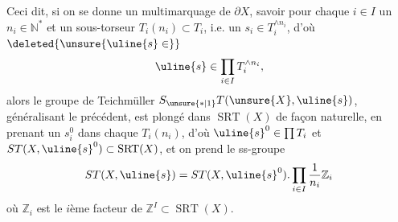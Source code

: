 
Ceci dit, si on se donne un
multimarquage de $\partial X$, savoir pour
chaque $i\in I$ un $n_i\in\mathbb N^*$ et un
sous-torseur
$T_i(n_i)\subset T_i$,
 i.e.
un $s_i\in T_i^{\wedge n_i}$, d'où
$\deleted{\unsure{\uline{s}\in}}$
\[
\uline{s}\in\prod_{i\in I}T_i^{\wedge n_i},
\]
alors le groupe de Teichmüller 
$S_{\unsure{*|1}}T(\unsure{X},\uline{s})$,
généralisant le précédent, est
plongé dans $\operatorname{SRT}(X)$ de façon naturelle,
en prenant un $s_i^0$ dans chaque $T_i(n_i)$, d'où
$\uline{s}^0\in\prod T_i$ et
$ST(X,\uline{s}^0)\subset\operatorname{SRT}(X)$,
et on prend le ss-groupe
\[
ST(X,\uline{s})=ST(X,\uline{s}^0).
\prod_{i\in I}\frac1{n_i}\mathbb Z_i
\]
où $\mathbb Z_i$ est le $i$ème facteur de
$\mathbb Z^I\subset\operatorname{SRT}(X)$.

